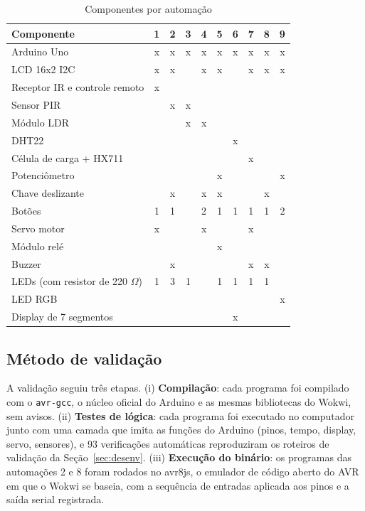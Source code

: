 \documentclass[12pt]{article}
\begin{document}
\begin{table}[ht]
\centering
\caption{Componentes por automação}\label{tab:comp}
\footnotesize
\begin{tabularx}{\textwidth}{lccccccccc}
\toprule
Componente & 1 & 2 & 3 & 4 & 5 & 6 & 7 & 8 & 9 \\
\midrule
Arduino Uno & x & x & x & x & x & x & x & x & x \\
LCD 16x2 I2C & x & x &  & x & x &  & x & x & x \\
Receptor IR e controle remoto & x &  &  &  &  &  &  &  &  \\
Sensor PIR &  & x & x &  &  &  &  &  &  \\
Módulo LDR &  &  & x & x &  &  &  &  &  \\
DHT22 &  &  &  &  &  & x &  &  &  \\
Célula de carga + HX711 &  &  &  &  &  &  & x &  &  \\
Potenciômetro &  &  &  &  & x &  &  &  & x \\
Chave deslizante &  & x &  & x & x &  &  & x &  \\
Botões & 1 & 1 &  & 2 & 1 & 1 & 1 & 1 & 2 \\
Servo motor & x &  &  & x &  &  & x &  &  \\
Módulo relé &  &  &  &  & x &  &  &  &  \\
Buzzer &  & x &  &  &  &  & x & x &  \\
LEDs (com resistor de 220 $\Omega$) & 1 & 3 & 1 &  & 1 & 1 & 1 & 1 &  \\
LED RGB &  &  &  &  &  &  &  &  & x \\
Display de 7 segmentos &  &  &  &  &  & x &  &  &  \\
\bottomrule
\end{tabularx}
\end{table}

\subsection{Método de validação}

A validação seguiu três etapas. (i) \textbf{Compilação}: cada programa foi compilado com o \texttt{avr-gcc}, o núcleo oficial do Arduino e as mesmas bibliotecas do Wokwi, sem avisos. (ii) \textbf{Testes de lógica}: cada programa foi executado no computador junto com uma camada que imita as funções do Arduino (pinos, tempo, display, servo, sensores), e 93 verificações automáticas reproduziram os roteiros de validação da Seção~\ref{sec:desenv}. (iii) \textbf{Execução do binário}: os programas das automações 2 e 8 foram rodados no avr8js, o emulador de código aberto do AVR em que o Wokwi se baseia, com a sequência de entradas aplicada aos pinos e a saída serial registrada.
\end{document}
